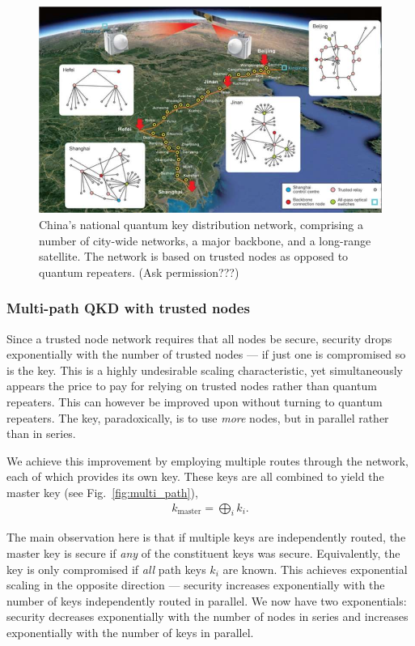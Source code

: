 \begin{figure}[!htb]
	\centering
	\includegraphics[width=2\columnwidth]{figures/China_network.jpeg}
	\caption{China's national quantum key distribution network, comprising a number of city-wide networks, a major backbone, and a long-range satellite. The network is based on trusted nodes as opposed to quantum repeaters. (Ask permission???)}	\label{fig:china_network} %
\end{figure}

\subsubsection{Multi-path QKD with trusted nodes}\label{multi-path-qkd-with-trusted-nodes}

Since a trusted node network requires that all nodes be secure, security drops exponentially with the number of trusted nodes --- if just one is compromised so is the key. This is a highly undesirable scaling characteristic, yet simultaneously appears the price to pay for relying on trusted nodes rather than quantum repeaters. This can however be improved upon without turning to quantum repeaters. The key, paradoxically, is to use \emph{more} nodes, but in parallel rather than in series.

We achieve this improvement by employing multiple routes through the network, each of which provides its own key. These keys are all combined to yield the master key (see Fig.~\ref{fig:multi_path}),
\begin{align}
	k_\textrm{master} = \bigoplus_i k_i.
\end{align}

The main observation here is that if multiple keys are independently routed, the master key is secure if \emph{any} of the constituent keys was secure. Equivalently, the key is only compromised if \emph{all} path keys $k_i$ are known. This achieves exponential scaling in the opposite direction --- security increases exponentially with the number of keys independently routed in parallel. We now have two exponentials: security decreases exponentially with the number of nodes in series and increases exponentially with the number of keys in parallel.

